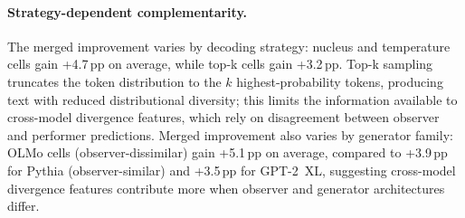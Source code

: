 \begin{table}[h]
\centering
\small
\caption{Per-cell feature ablation (4-class accuracy \%, 5-fold CV, RF 200 trees). $\Delta$: merged minus 19-feature accuracy. Bino-11 per-cell values omitted because Binoculars features were computed on the pooled 9-cell corpus; the per-cell mean (78.1\%) is reported in Table~\ref{tab:bino_ablation}.}
\label{tab:bino_ablation_percell}
\end{table}

\paragraph{Strategy-dependent complementarity.}
The merged improvement varies by decoding strategy: nucleus and temperature cells gain +4.7\,pp on average, while top-k cells gain +3.2\,pp.
Top-k sampling truncates the token distribution to the $k$ highest-probability tokens, producing text with reduced distributional diversity; this limits the information available to cross-model divergence features, which rely on disagreement between observer and performer predictions.
Merged improvement also varies by generator family: OLMo cells (observer-dissimilar) gain +5.1\,pp on average, compared to +3.9\,pp for Pythia (observer-similar) and +3.5\,pp for GPT-2~XL, suggesting cross-model divergence features contribute more when observer and generator architectures differ.


